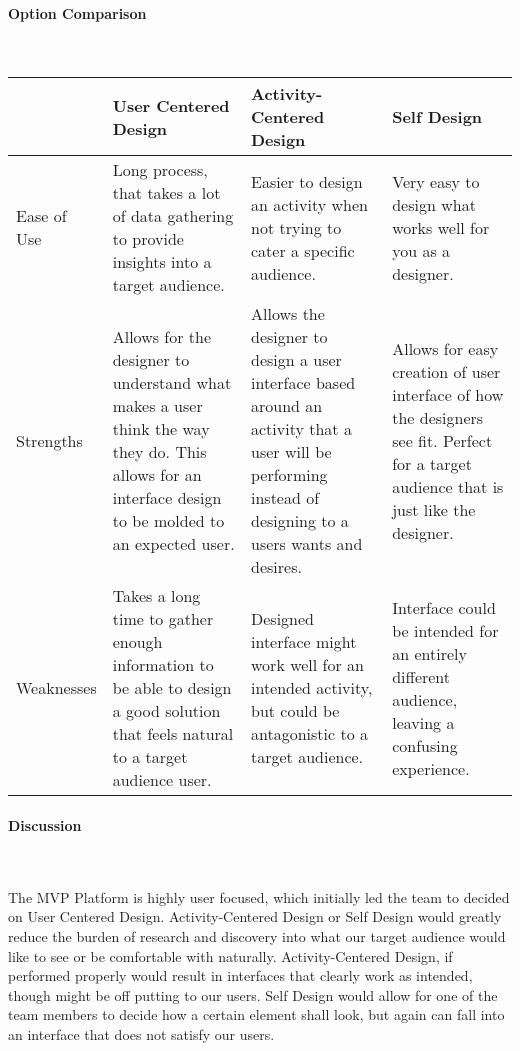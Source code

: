 \documentclass[letterpaper, 10pt, draftclsnofoot, compsoc, onecolumn]{IEEEtran}
\begin{document}
{{\begin{itemize}
\end{itemize}

\par}

\vspace{2pc}

\newpage
\paragraph{Option Comparison} ~\\
\vspace{1pc}
\tablehead{}
\begin{supertabular}{|p{2cm}|p{4cm}|p{4cm}|p{4cm}|}
\hline  & User Centered Design & Activity-Centered Design & Self Design\\ \hline
Ease of Use 
	& Long process, that takes a lot of data gathering to provide insights into a target audience. 
	& Easier to design an activity when not trying to cater a specific audience. & Very easy to design what works well for you as a designer. \\ \hline
Strengths 
	& Allows for the designer to understand what makes a user think the way they do. This allows for an interface design to be molded to an expected user. & Allows the designer to design a user interface based around an activity that a user will be performing instead of designing to a users wants and desires. & Allows for easy creation of user interface of how the designers see fit. Perfect for a target audience that is just like the designer. \\ \hline
Weaknesses 
	& Takes a long time to gather enough information to be able to design a good solution that feels natural to a target audience user. 
	& Designed interface might work well for an intended activity, but could be antagonistic to a target audience. 
	& Interface could be intended for an entirely different audience, leaving a confusing experience.\\ \hline

\end{supertabular}

\newpage
\paragraph{Discussion} ~\\
{\noindent The MVP Platform is highly user focused, which initially led the team to decided on User Centered Design. Activity-Centered Design or Self Design would greatly reduce the burden of research and discovery into what our target audience would like to see or be comfortable with naturally. Activity-Centered Design, if performed properly would result in interfaces that clearly work as intended, though might be off putting to our users. Self Design would allow for one of the team members to decide how a certain element shall look, but again can fall into an interface that does not satisfy our users.\par}

}
\end{document}

